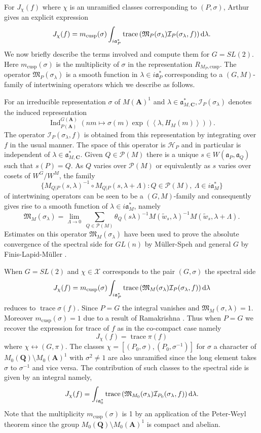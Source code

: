 \documentclass[11pt]{amsart}
\def\A{\mathbf A}
\def\C{\mathbf C}
\def\Q{\mathbf Q}
\def\HHH{\mathcal H}
\def\III{\mathcal I}
\def\MMM{\mathfrak M}	%
\def\PPP{\mathcal P}
\def\XXX{\mathcal X}
\def\aaa{\mathfrak a}
\def\d{\text d}
\def\bs{\setminus}
\def\cusp{\text{cusp}}
\def\Ind{\operatorname{Ind}}
\def\sprod#1#2{\left\langle #1 , #2 \right\rangle}  %
\def\trace{\operatorname{trace}}
\theoremstyle{remark}
\begin{document}
For $J_\chi(f)$ where $\chi$ is an unramified classes corresponding to $(P, \sigma)$, Arthur gives an explicit expression
\[ J_\chi(f) = m_{\cusp}(\sigma) \int_{i\aaa_P^*} \trace\left(\MMM_P(\sigma_\lambda) \III_P(\sigma_\lambda, f)\right) \d \lambda. \]
We now briefly describe the terms involved and compute them for $G=SL(2)$. Here $m_{\cusp}(\sigma)$ is the multiplicity of $\sigma$ in the representation $R_{M_P, \cusp}$. The operator $\MMM_P(\sigma_\lambda)$ is a smooth function in $\lambda \in i\aaa_P^*$ corresponding to a $(G, M)$-family of intertwining operators which we describe as follows. 

For an irreducible representation $\sigma$ of $M(\A)^1$ and $\lambda \in \aaa_{M, \C}^*, \III_P(\sigma_\lambda)$ denotes the induced representation
\[ \Ind_{P(\A)}^{G(\A)} \left( nm \mapsto \sigma(m) \exp(\sprod{\lambda}{H_M(m)}) \right). \]
The operator $\III_P(\sigma_\lambda, f)$ is obtained from this representation by integrating over $f$ in the usual manner. The space of this operator is $\HHH_P$ and in particular is independent of $\lambda \in \aaa_{M, \C}^*$. Given $Q \in \PPP(M)$ there is a unique $s \in W(\aaa_P, \aaa_Q)$ such that $s(P) = Q$. As $Q$ varies over $\PPP(M)$ or equivalently as $s$ varies over cosets of $W^G/W^M$, the family
\[ \{ M_{Q|P}(s, \lambda)^{-1} \circ M_{Q|P}(s, \lambda + \Lambda) : Q \in \PPP(M), \ \Lambda \in i\aaa_M^* \} \]
of intertwining operators can be seen to be a $(G, M)$-family and consequently gives rise to a smooth function of $\lambda \in i\aaa_M^*$, namely
\[ \MMM_M(\sigma_\lambda) = \lim_{\Lambda \to 0} \ \sum_{Q \in \PPP(M)} \theta_Q(s\lambda)^{-1} M(\tilde w_s, \lambda)^{-1} M(\tilde w_s, \lambda + \Lambda). \]
Estimates on this operator $\MMM_M(\sigma_\lambda)$ have been used to prove the absolute convergence of the spectral side for $GL(n)$ by M{\"u}ller-Speh \cite{MS} and general $G$ by Finis-Lapid-M{\"u}ller \cite{FLM}.

When $G = SL(2)$ and $\chi \in \XXX$ corresponds to the pair $(G, \sigma)$ the spectral side
\[ J_\chi(f) = m_{\text{cusp}}(\sigma) \int_{i\aaa_P^*} \trace\left(\MMM_M(\sigma_\lambda) \III_P(\sigma_\lambda, f)\right) \d \lambda \]
reduces to $\trace \sigma(f)$. Since $P=G$ the integral vanishes and $\MMM_M(\sigma, \lambda) = 1$. Moreover $m_\text{cusp} (\sigma) = 1$ due to a result of Ramakrishna \cite{MR1792292}. Thus when $P=G$ we recover the expression for trace of $f$ as in the co-compact case namely
\[ J_\chi(f) = \trace \pi(f) \]
where $\chi \leftrightarrow (G, \pi)$. The classes $\chi = [(P_0, \sigma), (P_0, \sigma^{-1})]$ for $\sigma$ a character of $M_0(\Q) \bs M_0(\A)^1$ with $\sigma^2 \neq 1$ are also unramified since the long element takes $\sigma$ to $\sigma^{-1}$ and vice versa. The contribution of such classes to the spectral side is given by an integral namely,
\[ J_\chi(f) = \int_{i\aaa_0^*} \trace\left( \MMM_{M_0}(\sigma_\lambda) \III_{P_0}(\sigma_\lambda, f) \right) \d \lambda. \]
Note that the multiplicity $m_{\text{cusp}}(\sigma)$ is 1 by an application of the Peter-Weyl theorem since the group $M_0(\Q)\bs M_0(\A)^1$ is compact and abelian. 
\end{document}
